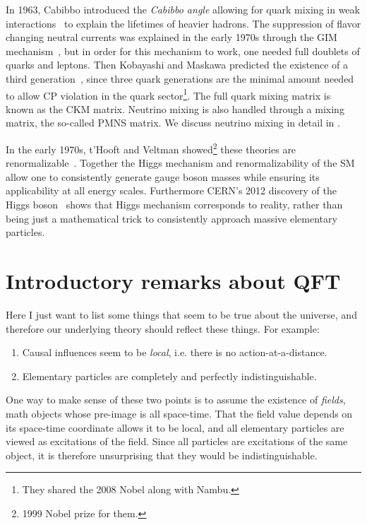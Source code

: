 In 1963, Cabibbo introduced the {\it Cabibbo angle} allowing
for quark mixing in weak interactions~\cite{cabibbo_unitary_1963} to
explain the lifetimes of heavier hadrons. The suppression of flavor changing
neutral currents was explained in the early 1970s through the GIM
mechanism~\cite{glashow_weak_1970}, but in order for this mechanism to work,
one needed full doublets of quarks and leptons.
Then Kobayashi and Maskawa predicted the existence of a third
generation~\cite{kobayashi_cp_1973}, since three quark generations are the
minimal amount needed to allow CP violation in the quark sector\footnote{They
shared the 2008 Nobel along with Nambu.}. The full quark mixing matrix
is known as the CKM matrix. Neutrino mixing is also handled
through a mixing matrix, the so-called PMNS matrix. 
We discuss neutrino mixing in detail
in .


In the early 1970s, t'Hooft and Veltman
showed\footnote{1999 Nobel prize for them.} these theories are
renormalizable~\cite{t_hooft_regularization_1972}. Together the Higgs mechanism
and renormalizability of the SM allow one to consistently generate gauge boson
masses while ensuring its applicability at all energy scales.
Furthermore CERN's 2012 discovery of the Higgs 
boson~\cite{aad_observation_2012,chatrchyan_observation_2012} shows that Higgs mechanism
corresponds to reality, rather than being just a mathematical trick to 
consistently approach massive elementary particles.

\section{Introductory remarks about QFT}\label{sec:QFTintroRemarks}

Here I just want to list some things that seem to be true about the universe,
and therefore our underlying theory should reflect these things. For example:
\begin{enumerate}
  \item Causal influences seem to be {\it local}, i.e. there is no
        action-at-a-distance.
  \item Elementary particles are completely and perfectly indistinguishable.
\end{enumerate}
One way to make sense of these two points is to assume the existence of 
{\it fields}, math objects whose pre-image is all space-time.
That the field value depends on its space-time coordinate allows it to be local,
and all elementary particles are viewed as excitations of the field. Since all
particles are excitations of the same object, it is therefore unsurprising that
they would be indistinguishable.

